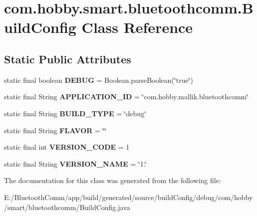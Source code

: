 \hypertarget{classcom_1_1hobby_1_1smart_1_1bluetoothcomm_1_1_build_config}{}\section{com.\+hobby.\+smart.\+bluetoothcomm.\+Build\+Config Class Reference}
\label{classcom_1_1hobby_1_1smart_1_1bluetoothcomm_1_1_build_config}
\subsection*{Static Public Attributes}
\begin{DoxyCompactItemize}
\item 
\mbox{\label{classcom_1_1hobby_1_1smart_1_1bluetoothcomm_1_1_build_config_a2fb22490d02b1394f3fb17c9458e1776}} 
static final boolean {\bfseries D\+E\+B\+UG} = Boolean.\+parse\+Boolean(\char`\"{}true\char`\"{})
\item 
\mbox{\label{classcom_1_1hobby_1_1smart_1_1bluetoothcomm_1_1_build_config_a3d8c7eb92b2336ae28343145f338f194}} 
static final String {\bfseries A\+P\+P\+L\+I\+C\+A\+T\+I\+O\+N\+\_\+\+ID} = \char`\"{}com.\+hobby.\+mallik.\+bluetoothcomm\char`\"{}
\item 
\mbox{\label{classcom_1_1hobby_1_1smart_1_1bluetoothcomm_1_1_build_config_a3707b0be084a21f6eecbb172d4192f11}} 
static final String {\bfseries B\+U\+I\+L\+D\+\_\+\+T\+Y\+PE} = \char`\"{}debug\char`\"{}
\item 
\mbox{\label{classcom_1_1hobby_1_1smart_1_1bluetoothcomm_1_1_build_config_a029b2d6b339a5a523af32b1f5e9b26dd}} 
static final String {\bfseries F\+L\+A\+V\+OR} = \char`\"{}\char`\"{}
\item 
\mbox{\label{classcom_1_1hobby_1_1smart_1_1bluetoothcomm_1_1_build_config_a59cb84b3c034e53012c8fec6864d0c73}} 
static final int {\bfseries V\+E\+R\+S\+I\+O\+N\+\_\+\+C\+O\+DE} = 1
\item 
\mbox{\label{classcom_1_1hobby_1_1smart_1_1bluetoothcomm_1_1_build_config_a576db00cefc317dc315230eba8ee1644}} 
static final String {\bfseries V\+E\+R\+S\+I\+O\+N\+\_\+\+N\+A\+ME} = \char`\"{}1.\char`\"{}
\end{DoxyCompactItemize}


The documentation for this class was generated from the following file\+:\begin{DoxyCompactItemize}
\item 
E\+:/\+Bluetooth\+Comm/app/build/generated/source/build\+Config/debug/com/hobby/smart/bluetoothcomm/Build\+Config.\+java\end{DoxyCompactItemize}
